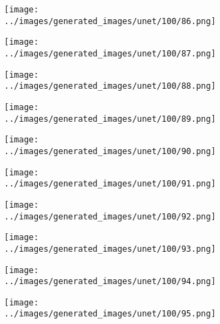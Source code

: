 \begin{figure}[H]
\begin{subfigure}[b]{0.1\textwidth}
\centering
\texttt{[image: ../images/generated\_images/unet/100/86.png]}
\end{subfigure}
\hspace{1em}%
\begin{subfigure}[b]{0.1\textwidth}
\centering
\texttt{[image: ../images/generated\_images/unet/100/87.png]}
\end{subfigure}
\hspace{1em}%
\begin{subfigure}[b]{0.1\textwidth}
\centering
\texttt{[image: ../images/generated\_images/unet/100/88.png]}
\end{subfigure}
\hspace{1em}%
\begin{subfigure}[b]{0.1\textwidth}
\centering
\texttt{[image: ../images/generated\_images/unet/100/89.png]}
\end{subfigure}
\hspace{1em}%
\begin{subfigure}[b]{0.1\textwidth}
\centering
\texttt{[image: ../images/generated\_images/unet/100/90.png]}
\end{subfigure}
\hspace{1em}%
\begin{subfigure}[b]{0.1\textwidth}
\centering
\texttt{[image: ../images/generated\_images/unet/100/91.png]}
\end{subfigure}
\hspace{1em}%
\begin{subfigure}[b]{0.1\textwidth}
\centering
\texttt{[image: ../images/generated\_images/unet/100/92.png]}
\end{subfigure}
\hspace{1em}%
\begin{subfigure}[b]{0.1\textwidth}
\centering
\texttt{[image: ../images/generated\_images/unet/100/93.png]}
\end{subfigure}
\hspace{1em}%
\begin{subfigure}[b]{0.1\textwidth}
\centering
\texttt{[image: ../images/generated\_images/unet/100/94.png]}
\end{subfigure}
\hspace{1em}%
\begin{subfigure}[b]{0.1\textwidth}
\centering
\texttt{[image: ../images/generated\_images/unet/100/95.png]}
\end{subfigure}

\end{figure}
